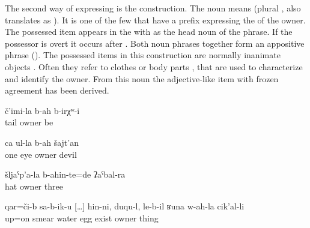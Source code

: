 The second way of expressing  is the  construction. The noun  means  (plural , also translates as ). It is one of the few  that have a  prefix expressing the  of the owner. The possessed item appears in the  with  as the head noun of the  phrase. If the possessor is overt it occurs after . Both noun phrases together form an appositive phrase (). The possessed items in this construction are normally inanimate objects . Often they refer to clothes  or body parts ,  that are used to characterize and identify the owner. From this noun the adjective-like item   with frozen  agreement has been derived.
%
\begin{exe}
	\ex	\label{ex:There was one with a tail}
	\gll	č'imi-la	b-ah	b-irχʷ-i\\
		tail	owner	be\\
	\glt	{}

	\ex	\label{ex:the devil with one eye}
	\gll	ca	ul-la	b-ah	šajt'an\\
		one	eye	owner	devil\\
	\glt	{}

	\ex	\label{ex:‎All three had hats}
	\gll	šljaˁp'a-la	b-ahin-te=de	ʡaˁbal-ra\\
		hat	owner	three\\
	\glt	{}

	\ex	\label{ex:‎On the upper side you smear water, egg, whatever you have}
	\gll	qar=či-b	sa-b-ik-u	[\ldots] hin-ni,	duqu-l, le-b-il	ʁuna	w-ah-la	cik'al-li\\
		up=on	smear {}	water\tsc{-erg}	egg	exist		owner	thing\\
	\glt	{}
\end{exe}
